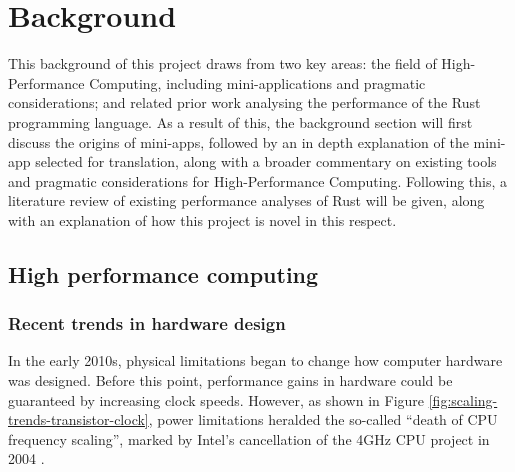 \chapter{Background}
\label{ch:background}


This background of this project draws from two key areas: the field of High-Performance Computing, including mini-applications  and pragmatic considerations; and related prior work analysing the performance of the Rust programming language. As a result of this, the background section will first discuss the origins of mini-apps, followed by an in depth explanation of the mini-app selected for translation, along with a broader commentary on existing tools and pragmatic considerations for High-Performance Computing. Following this, a literature review of existing performance analyses of Rust will be given, along with an explanation of how this project is novel in this respect.



\section{High performance computing}
\label{sec:hpc} %


\subsection{Recent trends in hardware design}
\label{ssec:hardware-design-trends} %

In the early 2010s, physical limitations began to change how computer hardware was designed. Before this point, performance gains in hardware could be guaranteed by increasing clock speeds. However, as shown in Figure \ref{fig:scaling-trends-transistor-clock}, power limitations heralded the so-called ``death of CPU frequency scaling'', marked by Intel's cancellation of the 4GHz CPU project in 2004 \cite{markovLimitsFundamentalLimits2014}.

